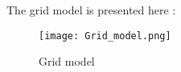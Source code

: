 %
%
%
%
%

The grid model is presented here :
\begin{figure}[h]
    \begin{center}
        \texttt{[image: Grid\_model.png]}
    \end{center}
    \label{fig:Grid_model}
    \caption{Grid model}
\end{figure}
